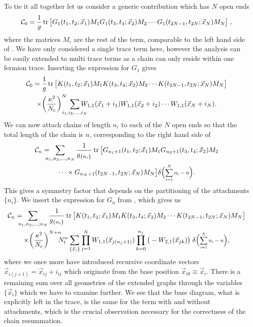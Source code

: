 To tie it all together let us consider a generic contribution which has $N$ open
ends
%
\begin{equation} \label{eq:chain_begin}
  \mathcal{C}_0 = \frac{1}{g} \operatorname{tr} \big[
    G_1(t_1,t_2;\vec{x}_1) M_1 G_1 (t_3,t_4;\vec{x}_2) M_2 \cdots
    G_1 (t_{2N-1},t_{2N};\vec{x}_N) M_N
  \big]\;,
\end{equation}
%
where the matrices $M_i$ are the rest of the term, comparable to the left hand
side of . We have only considered a single trace term
here, however the analysis can be easily extended to multi trace terms as a
chain can only reside within one fermion trace. Inserting the expression for
$G_1$ gives
%
\begin{multline}
  \mathcal{C}_0 =
    \frac{1}{g} \tr \big[
      K(t_1,t_2;\vec{x}_1) M_1 K(t_3,t_4;\vec{x}_2) M_2
      \cdots K(t_{2N-1},t_{2N};\vec{x}_N) M_N
    \big] \\
  \times \bigg(\frac{\kappa^2}{N_c}\bigg)^N\;\sum_{\mathclap{i_1,i_2,\dots,i_N}}
    W_{1,1}(\vec{x}_1 + i_1) W_{1,1}(\vec{x}_2 + i_2) 
    \cdots W_{1,1}(\vec{x}_N + i_N).
\end{multline}
%
We can now attach chains of length $n_i$ to each of the $N$ open ends so that
the total length of the chain is $n$, corresponding to the right hand side of
%
\begin{multline}
  \mathcal{C}_n =
    \hskip .2cm\sum_{\mathclap{n_1,n_2,\dots,n_N}} \hskip .5cm
      \frac{1}{g_{\{n_i\}}}
      \tr \big[
        G_{n_1 + 1}(t_1,t_2;\vec{x}_1) M_1
        G_{n_2+1} (t_3,t_4;\vec{x}_2) M_2 \\ 
        \cdots \times G_{n_N + 1} (t_{2N-1},t_{2N};\vec{x}_N) M_N
      \big]
    \delta\Big(\scalemath{0.8}{\sum_{i=1}^N n_i - n}\Big).
\end{multline}
%
This gives a symmetry factor that depends on the partitioning of the attachments
$\{n_i\}$.  We insert the expression for $G_n$ from , which
gives us
%
\begin{multline}
  \mathcal{C}_n =
    \hskip .2cm\sum_{\mathclap{n_1,n_2,\dots,n_N}} \hskip .5cm
      \frac{1}{g_{\{n_i\}}}
      \tr \big[
        K(t_1,t_2;\vec{x}_1) M_1 K(t_3,t_4;\vec{x}_2) M_2 \cdots
        K(t_{2N-1},t_{2N};\vec{x}_N) M_N
      \big]\\
  \times \bigg(\frac{\kappa^2}{N_c}\bigg)^{N+\mathrlap{n}}
    N_{t}^n \sum_{\{\vec{x}_i\}} \prod_{j=1}^N W_{1,1}(\vec{x}_{j (n_j+1)})
    \prod_{k=0}^{n_j} \big(-W_{2,1}(\vec{x}_{j k})\big) \;
    \delta\Big(\scalemath{0.8}{\sum_{i=1}^N n_i - n}\Big),
\end{multline}
%
where we once more have introduced recursive coordinate vectors
$\vec{x}_{i(j+1)} = \vec{x}_{ij} + i_{ij}$ which originate from the base
position $\vec{x}_{i0} \equiv \vec{x}_i$. There is a remaining sum over all
geometries of the extended graphs through the variables $\{\vec{x}_i\}$ which we
have to examine further.  We see that the base diagram, what is explicitly left
in the trace, is the same for the term with and without attachments, which is
the crucial observation necessary for the correctness of the chain resummation.

